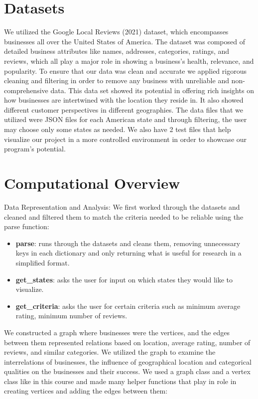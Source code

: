 \documentclass[fontsize=11pt]{article}
\begin{document}
\section*{Datasets}

We utilized the Google Local Reviews (2021) dataset, which encompasses businesses all over the United States of America. The dataset was composed of detailed business attributes like names, addresses, categories, ratings, and reviews, which all play a major role in showing a business's health, relevance, and popularity. To ensure that our data was clean and accurate we applied rigorous cleaning and filtering in order to remove any business with unreliable and non-comprehensive data. This data set showed its potential in offering rich insights on how businesses are intertwined with the location they reside in. It also showed different customer perspectives in different geographies. The data files that we utilized were JSON files for each American state and through filtering, the user may choose only some states as needed. We also have 2 test files that help visualize our project in a more controlled environment in order to showcase our program's potential.

\section*{Computational Overview}

Data Representation and Analysis: We first worked through the datasets and cleaned and filtered them to match the criteria needed to be reliable using the parse function:

\begin{itemize}
    \item \textbf{parse}: runs through the datasets and cleans them, removing unnecessary keys in each dictionary and only returning what is useful for research in a simplified format.
    \item \textbf{get\_states}: asks the user for input on which states they would like to visualize.
    \item \textbf{get\_criteria}: asks the user for certain criteria such as minimum average rating, minimum number of reviews.
\end{itemize}

We constructed a graph where businesses were the vertices, and the edges between them represented relations based on location, average rating, number of reviews, and similar categories. We utilized the graph to examine the interrelations of businesses, the influence of geographical location and categorical qualities on the businesses and their success. We used a graph class and a vertex class like in this course and made many helper functions that play in role in creating vertices and adding the edges between them:
\end{document}
